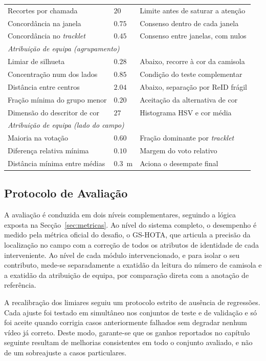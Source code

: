 \begin{table}[htbp]
\begin{tabular}{lll}
        Recortes por chamada         & $20$            & Limite antes de saturar a atenção \\
        Concordância na janela       & $0.75$          & Consenso dentro de cada janela \\
        Concordância no \emph{tracklet} & $0.45$       & Consenso entre janelas, com nulos \\
        \hline
        \multicolumn{3}{l}{\emph{Atribuição de equipa (agrupamento)}} \\
        Limiar de silhueta           & $0.28$          & Abaixo, recorre à cor da camisola \\
        Concentração num dos lados   & $0.85$          & Condição do teste complementar \\
        Distância entre centros      & $2.04$          & Abaixo, separação por ReID frágil \\
        Fração mínima do grupo menor & $0.20$          & Aceitação da alternativa de cor \\
        Dimensão do descritor de cor & $27$            & Histograma HSV e cor média \\
        \hline
        \multicolumn{3}{l}{\emph{Atribuição de equipa (lado do campo)}} \\
        Maioria na votação           & $0.60$          & Fração dominante por \emph{tracklet} \\
        Diferença relativa mínima    & $0.10$          & Margem do voto relativo \\
        Distância mínima entre médias & $0.3$~m        & Aciona o desempate final \\
        \hline
    \end{tabular}
\end{table}


\subsection{Protocolo de Avaliação}

A avaliação é conduzida em dois níveis complementares, seguindo a lógica exposta na
Secção~\ref{sec:metricas}. Ao nível do sistema completo, o desempenho é medido pela métrica oficial
do desafio, o GS-HOTA, que articula a precisão da localização no campo com a correção de todos os
atributos de identidade de cada interveniente. Ao nível de cada módulo intervencionado, e para isolar
o seu contributo, mede-se separadamente a exatidão da leitura do número de camisola e a exatidão da
atribuição de equipa, por comparação direta com a anotação de referência.

A recalibração dos limiares seguiu um protocolo estrito de ausência de regressões. Cada ajuste foi
testado em simultâneo nos conjuntos de teste e de validação e só foi aceite quando corrigia casos
anteriormente falhados sem degradar nenhum vídeo já correto. Deste modo, garante-se que os ganhos
reportados no capítulo seguinte resultam de melhorias consistentes em todo o conjunto avaliado, e não
de um sobreajuste a casos particulares.
